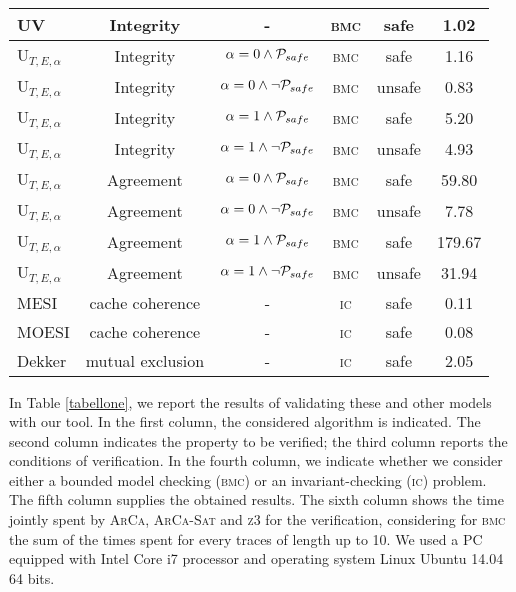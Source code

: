 \documentclass[11pt,a4paper]{article}
\begin{document}
{\begin{table}
{\begin{tabular}{|l|c|c|c|c|c|}
UV \cite{heardof} & Integrity & - & \textsc{bmc} & safe & 1.02 \\ \hline
U$_{T,E,\alpha}$  \cite{Biely07} & Integrity & $\alpha=0 \wedge {\cal P}_{safe}$ & \textsc{bmc} & safe & 1.16  \\ \hline
U$_{T,E,\alpha}$  \cite{Biely07} & Integrity & $\alpha=0 \wedge \neg{\cal P}_{safe}$ & \textsc{bmc} & unsafe & 0.83  \\ \hline
U$_{T,E,\alpha}$  \cite{Biely07} & Integrity & $\alpha=1 \wedge {\cal P}_{safe}$ & \textsc{bmc} & safe & 5.20  \\ \hline
U$_{T,E,\alpha}$  \cite{Biely07} & Integrity & $\alpha=1 \wedge \neg{\cal P}_{safe}$ & \textsc{bmc} & unsafe & 4.93  \\ \hline
U$_{T,E,\alpha}$  \cite{Biely07} & Agreement & $\alpha=0 \wedge {\cal P}_{safe}$ & \textsc{bmc} & safe & 59.80  \\ \hline
U$_{T,E,\alpha}$  \cite{Biely07} & Agreement & $\alpha=0 \wedge \neg{\cal P}_{safe}$ & \textsc{bmc} & unsafe & 7.78  \\ \hline
U$_{T,E,\alpha}$  \cite{Biely07} & Agreement & $\alpha=1 \wedge {\cal P}_{safe}$ & \textsc{bmc} & safe & 179.67  \\ \hline
U$_{T,E,\alpha}$  \cite{Biely07} & Agreement & $\alpha=1 \wedge \neg{\cal P}_{safe}$ & \textsc{bmc} & unsafe & 31.94  \\ \hline
MESI \cite{Patel84} & cache coherence & - & \textsc{ic} & safe & 0.11  \\ \hline
MOESI \cite{MOESI} & cache coherence & - & \textsc{ic} & safe & 0.08  \\ \hline
Dekker \cite{Dekker} & mutual exclusion & - & \textsc{ic} & safe & 2.05  \\ \hline
\end{tabular}
}
\end{table}
In Table \ref{tabellone}, we report the results of validating these and other models with our tool.  In the first column, the considered algorithm is indicated.  The second column indicates the property to be verified; the third column reports the conditions of verification.  In the fourth column, we indicate whether we consider either a bounded model checking (\textsc{bmc}) or an invariant-checking (\textsc{ic}) problem.  The fifth column supplies the obtained results.  The sixth column shows the time jointly spent by \textsc{ArCa},  \textsc{ArCa-Sat} and \textsc{z3} for the verification, considering for \textsc{bmc} the sum of the times spent for every traces of length up to 10.  We used a PC equipped with Intel Core i7  processor and operating system Linux Ubuntu 14.04 64 bits.
}
\end{document}
